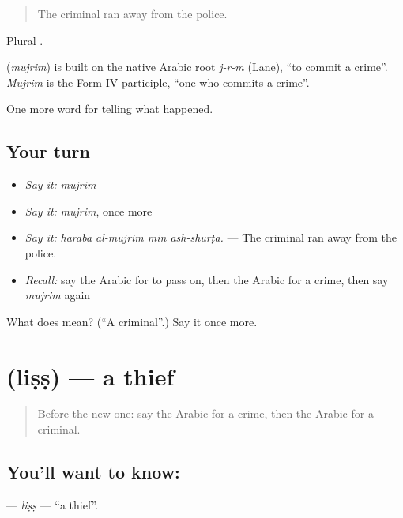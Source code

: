 \begin{quote}
The criminal ran away from the police.
\end{quote}

Plural .

\begin{cousinweb}
\textbf{} (\emph{mujrim}) is built on the native Arabic root \emph{j-r-m} (Lane), \textquotedblleft{}to commit a crime\textquotedblright{}. \emph{Mujrim} is the Form IV participle, \textquotedblleft{}one who commits a crime\textquotedblright{}.
\end{cousinweb}

\begin{grammarlens}[title={What you've built}]
One more word for telling what happened.
\end{grammarlens}

\subsection*{Your turn}
\begin{itemize}
\raggedright
  \item \emph{Say it:} \emph{mujrim}
  \item \emph{Say it:} \emph{mujrim}, once more
  \item \emph{Say it:} \emph{haraba al-mujrim min ash-shurṭa.} — The criminal ran away from the police.
  \item \emph{Recall:} say the Arabic for to pass on, then the Arabic for a crime, then say \emph{mujrim} again
\end{itemize}

\begin{tcolorbox}[breakable,colback=teal!4,colframe=teal!35!black,title={Before you move on}]
What does  mean? (\textquotedblleft{}A criminal\textquotedblright{}.) Say it once more.
\end{tcolorbox}
\section[\texorpdfstring{\ar{لص} (liṣṣ)}{لص (liṣṣ)}]{ (liṣṣ) — a thief}

\label{lesson:AR-C300-liss}



\begin{quote}
Before the new one: say the Arabic for a crime, then the Arabic for a criminal.
\end{quote}

\subsection*{You'll want to know: }
\textbf{} — \emph{liṣṣ} — \textquotedblleft{}a thief\textquotedblright{}.

